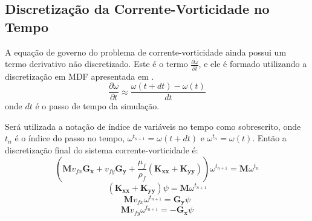\subsection{\textbf{Discretização da Corrente-Vorticidade no Tempo}}
A equação de governo  do problema de corrente-vorticidade ainda possui um termo derivativo não discretizado.
Este é o termo $\tfrac{\partial \omega}{\partial t}$, e ele é formado utilizando a discretização em MDF apresentada em .
 \begin{equation}
    \dfrac{\partial \omega}{\partial t} \approx
    \frac{
        \omega(t + dt) -
        \omega(t)
    }{dt}
\end{equation}
onde $dt$ é o passo de tempo da simulação.

Será utilizada a notação de índice de variáveis no tempo como sobrescrito, onde $t_n$ é o índice do passo no tempo, $\omega^{t_{n+1}} = \omega(t + dt)$ e $\omega^{t_{n}} = \omega(t)$.
Então a discretização final do sistema corrente-vorticidade é:
\begin{equation}
    \left(
        \mathbf{M}
        v_{fx}
        \mathbf{G_x}+
        v_{fy}
        \mathbf{G_y} +
        \dfrac{\mu_f}{\rho_f}
        \left(
        \mathbf{K_{xx}} +
        \mathbf{K_{yy}}
        \right)
    \right)
    \omega^{t_{n+1}} = 
    \mathbf{M}
    \omega^{t_{n}}
    \label{last_w}
\end{equation}
\begin{equation}
    \left(
    \mathbf{K_{xx}} +
    \mathbf{K_{yy}}
    \right)
    \psi =
    \mathbf{M}
    \omega^{t_{n+1}}
    \label{last_psi}
\end{equation}
\begin{equation}
    \mathbf{M}
    v_{fx}
    \omega^{t_{n+1}} =
    \mathbf{G_y}
    \psi
    \label{last_vx}
\end{equation}
\begin{equation}
    \mathbf{M}
    v_{fy}
    \omega^{t_{n+1}} = -
    \mathbf{G_x}
    \psi
    \label{last_vy}
\end{equation}


